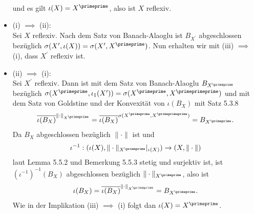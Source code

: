 \begin{solution}
\begin{itemize}
\begin{align*}
  \end{align*}
  und es gilt $\iota(X) = X^{\primeprime}$, also ist $X$ reflexiv.
  \item (i) $\implies$ (ii): \\
  Sei $X$ reflexiv. Nach dem Satz von Banach-Alaoglu ist $B_{X^{\prime}}$ abgeschlossen
  bezüglich $\sigma(X^{\prime}, \iota(X)) = \sigma(X^{\prime},X^{\primeprime})$.
  Nun erhalten wir mit (iii) $\implies$ (i), dass $X^{\prime}$ reflexiv ist.
  \item (ii) $\implies$ (i): \\
  Sei $X^{\prime}$ reflexiv. Dann ist mit dem Satz von Banach-Alaoglu $B_{X^{\primeprime}}$
  bezüglich $\sigma(X^{\primeprime}, \iota_1(X^{\prime})) = \sigma(X^{\primeprime}, X^{\primeprimeprime})$
  und mit dem Satz von Goldstine und der Konvexität von $\iota(B_X)$ mit Satz 5.3.8
  \begin{align*}
    \overline{\iota(B_X)}^{\|\cdot\|_{X^{\primeprime}}}
    = \overline{\iota(B_X)}^{\sigma(X^{\primeprime},X^{\primeprimeprime})} = B_{X^{\primeprime}}.
  \end{align*}
  Da $B_X$ abgeschlossen bezüglich $\|\cdot\|$ ist und
  \begin{align*}
    \iota^{-1}: (\iota(X), \|\cdot\|_{X^{\primeprime}}|_{\iota(X)}) \to (X,\|\cdot\|)
  \end{align*}
  laut Lemma 5.5.2 und Bemerkung 5.5.3
  stetig und surjektiv ist, ist $(\iota^{-1})^{-1}(B_X)$ abgeschlossen bezüglich $\|\cdot\|_{X^{\primeprime}}$,
  also ist
  \begin{align*}
    \iota(B_X) = \overline{\iota(B_X)}^{\|\cdot\|_{X^{\primeprime}}} = B_{X^{\primeprime}}.
  \end{align*}
  Wie in der Implikation (iii) $\implies$ (i) folgt dan $\iota(X) = X^{\primeprime}$.
 \end{itemize}
\end{solution}
